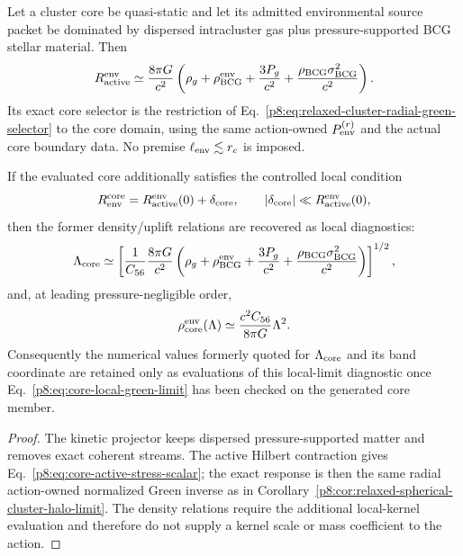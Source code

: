 \documentclass[12pt,a4paper]{article}
\begin{document}
\begin{corollary}
\label{p8:cor:cluster-core-bcg-uplift-limit}
Let a cluster core be quasi-static and let its admitted environmental source
packet be dominated by dispersed intracluster gas plus pressure-supported BCG
stellar material.  Then
\begin{equation}
\label{p8:eq:core-active-stress-scalar}
 R_{\rm active}^{\rm env}
 \simeq\frac{8\pi G}{c^2}
 \left(\rho_g+\rho_{\rm BCG}^{\rm env}
 +\frac{3P_g}{c^2}
 +\frac{\rho_{\rm BCG}\sigma_{\rm BCG}^2}{c^2}\right).
\end{equation}
Its exact core selector is the restriction of
Eq.~\eqref{p8:eq:relaxed-cluster-radial-green-selector} to the core domain,
using the same action-owned $P_{\rm env}^{(r)}$ and the actual core boundary
data.  No premise $\ell_{\rm env}\lesssim r_c$ is imposed.

If the evaluated core additionally satisfies the controlled local condition
\begin{equation}
\label{p8:eq:core-local-green-limit}
 R_{\rm env}^{\rm core}
 =R_{\rm active}^{\rm env}(0)+\delta_{\rm core},
 \qquad |\delta_{\rm core}|\ll R_{\rm active}^{\rm env}(0),
\end{equation}
then the former density/uplift relations are recovered as local diagnostics:
\begin{equation}
\label{p8:eq:core-Lambda-from-active-density}
 \Lambda_{\rm core}
 \simeq
 \left[\frac{1}{C_{56}}\frac{8\pi G}{c^2}
 \left(\rho_g+\rho_{\rm BCG}^{\rm env}
 +\frac{3P_g}{c^2}
 +\frac{\rho_{\rm BCG}\sigma_{\rm BCG}^2}{c^2}\right)\right]^{1/2},
\end{equation}
and, at leading pressure-negligible order,
\begin{equation}
\label{p8:eq:core-density-Lambda-conversion}
 \rho_{\rm core}^{\rm env}(\Lambda)
 \simeq\frac{c^2C_{56}}{8\pi G}\Lambda^2.
\end{equation}
Consequently the numerical values formerly quoted for $\Lambda_{\rm core}$
and its band coordinate are retained only as evaluations of this local-limit
diagnostic once Eq.~\eqref{p8:eq:core-local-green-limit} has been checked on
the generated core member.
\end{corollary}

\begin{proof}
The kinetic projector keeps dispersed pressure-supported matter and removes
exact coherent streams.  The active Hilbert contraction gives
Eq.~\eqref{p8:eq:core-active-stress-scalar}; the exact response is then the
same radial action-owned normalized Green inverse as in
Corollary~\ref{p8:cor:relaxed-spherical-cluster-halo-limit}.  The density
relations require the additional local-kernel evaluation and therefore do not
supply a kernel scale or mass coefficient to the action.
\end{proof}
\end{document}

